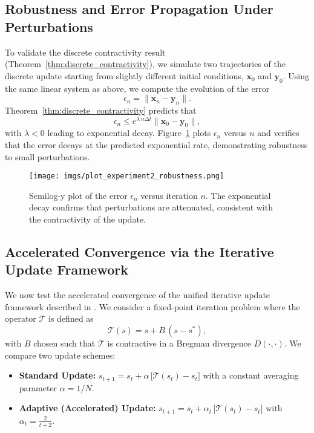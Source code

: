 \subsection{Robustness and Error Propagation Under Perturbations}
\label{sec:robustness}

To validate the discrete contractivity result (Theorem~\ref{thm:discrete_contractivity}), we simulate two trajectories of the discrete update starting from slightly different initial conditions, \(\mathbf{x}_0\) and \(\mathbf{y}_0\). Using the same linear system as above, we compute the evolution of the error
\[
\epsilon_n = \|\mathbf{x}_n - \mathbf{y}_n\|.
\]
Theorem~\ref{thm:discrete_contractivity} predicts that
\[
\epsilon_n \le e^{\lambda\, n\Delta t} \|\mathbf{x}_0 - \mathbf{y}_0\|,
\]
with \(\lambda < 0\) leading to exponential decay. Figure~\ref{fig:error_decay} plots \(\epsilon_n\) versus \(n\) and verifies that the error decays at the predicted exponential rate, demonstrating robustness to small perturbations.

\begin{figure}[ht]
  \centering
  \texttt{[image: imgs/plot\_experiment2\_robustness.png]}
  \caption{Semilog-y plot of the error \(\epsilon_n\) versus iteration \(n\). The exponential decay confirms that perturbations are attenuated, consistent with the contractivity of the update.}
  \label{fig:error_decay}
\end{figure}

\subsection{Accelerated Convergence via the Iterative Update Framework}
\label{sec:accelerated_experiment}

We now test the accelerated convergence of the unified iterative update framework described in \cite{feinashley2025iterate}. We consider a fixed-point iteration problem where the operator \(\mathcal{T}\) is defined as
\[
\mathcal{T}(s) = s + B\,(s-s^*),
\]
with \(B\) chosen such that \(\mathcal{T}\) is contractive in a Bregman divergence \(D(\cdot,\cdot)\). We compare two update schemes:
\begin{itemize}[leftmargin=2em]
    \item \textbf{Standard Update:} \( s_{t+1} = s_t + \alpha\, \bigl[\mathcal{T}(s_t) - s_t\bigr] \) with a constant averaging parameter \(\alpha = 1/N\).
    \item \textbf{Adaptive (Accelerated) Update:} \( s_{t+1} = s_t + \alpha_t\, \bigl[\mathcal{T}(s_t) - s_t\bigr] \) with \(\alpha_t = \frac{2}{t+2}\).
\end{itemize}

